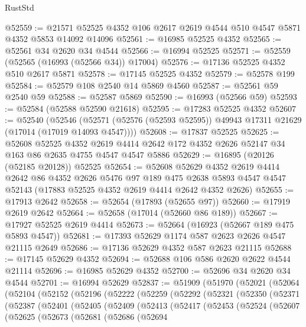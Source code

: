 \begin{lexlean}{RustStd}
\begin{coremodule}
@52559 := @21571 @52525 @4352 @106 @2617 @2619 @4544 @510 @4547 @5871 @4352 @5853 @14092 @14096
@52561 := @16985 @52525 @4352
@52565 := @52561 @34 @2620 @34 @4544
@52566 := @16994 @52525
@52571 := @52559 (@52565 (@16993 (@52566 @34)) @17004)
@52576 := @17136 @52525 @4352 @510 @2617 @5871
@52578 := @17145 @52525 @4352
@52579 := @52578 @199
@52584 := @52579 @108 @2540 @14 @5869 @4560
@52587 := @52561 @59 @2540 @59
@52588 := @52587 @5869
@52590 := @16993 (@52566 @59)
@52593 := @52584 (@52588 @52590 @21618)
@52595 := @17283 @52525 @4352
@52607 := @52540
    (@52546 (@52571 (@52576 (@52593 @52595)) @49943 @17311 @21629 (@17014 (@17019 @14093 @4547))))
@52608 := @17837 @52525
@52625 := @52608
    @52525
    @4352
    @2619
    @4414
    @2642
    @172
    @4352
    @2626
    @52147
    @34
    @163
    @86
    @2635
    @4755
    @4547
    @4547
    @5886
@52629 := @16895 (@20126 (@52185 @20128)) @52525
@52654 := @52608
    @52629
    @4352
    @2619
    @4414
    @2642
    @86
    @4352
    @2626
    @5476
    @97
    @189
    @475
    @2638
    @5893
    @4547
    @4547
    @52143
    (@17883 @52525 @4352 @2619 @4414 @2642 @4352 @2626)
@52655 := @17913 @2642
@52658 := @52654 (@17893 (@52655 @97))
@52660 := @17919 @2619 @2642
@52664 := @52658 (@17014 (@52660 @86 @189))
@52667 := @17927 @52525 @2619 @4414
@52673 := @52664 (@16923 (@52667 @189 @475 @5893 @4547))
@52681 := @17393 @52629 @1174 @587 @2623 @2626 @4547 @21115 @2649
@52686 := @17136 @52629 @4352 @587 @2623 @21115
@52688 := @17145 @52629 @4352
@52694 := @52688 @106 @586 @2620 @2622 @4544 @21114
@52696 := @16985 @52629 @4352
@52700 := @52696 @34 @2620 @34 @4544
@52701 := @16994 @52629
@52837 := @51909
    (@51970
      (@52021
        (@52064
          (@52104
            (@52152
              (@52196
                (@52222
                  (@52259
                    (@52292
                      (@52321
                        (@52350
                          (@52371
                            (@52387
                              (@52401
                                (@52405
                                  (@52409
                                    (@52413
                                      (@52417
                                        (@52453
                                          (@52524
                                            (@52607
                                              (@52625
                                                (@52673
                                                  (@52681
                                                    (@52686
                                                      (@52694

\end{coremodule}
\end{lexlean}
